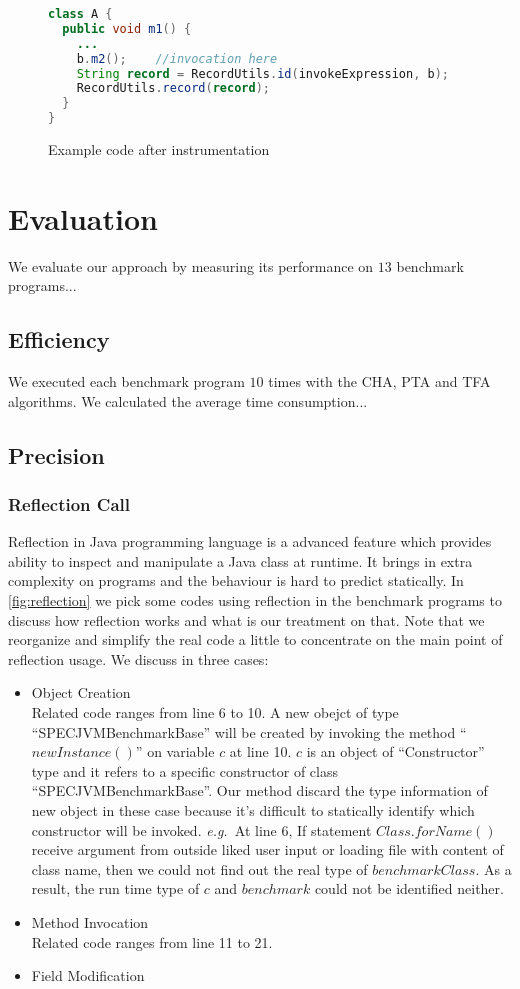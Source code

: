 \documentclass{fac}
\newcommand\eg{\textit{e.g.\ }}
\begin{document}
\begin{figure}
\begin{lstlisting}[language={java},frame={single}]
class A {
  public void m1() {
    ...
    b.m2();    //invocation here
    String record = RecordUtils.id(invokeExpression, b);
    RecordUtils.record(record);
  }
}
\end{lstlisting}
\caption{Example code after instrumentation}
\label{fig:after-instru}
\end{figure}



\section{Evaluation}\label{sec:evaluation}
We evaluate our approach by measuring its performance on $13$ benchmark programs...
\subsection{Efficiency}\label{subsec:efficiency}
We executed each benchmark program $10$ times with the CHA, PTA and TFA algorithms. We calculated the average time consumption...
\subsection{Precision}\label{subsec:precision}
\subsubsection{Reflection Call}\label{subsubsec:reflection-call}
Reflection in Java programming language is a advanced feature which provides ability to inspect and manipulate a Java class at runtime. It brings in extra complexity on programs and the behaviour is hard to predict statically. In \ref{fig:reflection} we pick some codes using reflection in the benchmark programs to discuss how reflection works and what is our treatment on that. Note that we reorganize and simplify the real code a little to concentrate on the main point of reflection usage. We discuss in three cases:
\begin{itemize}
\item Object Creation \\
Related code ranges from line 6 to 10. A new obejct of type ``SPECJVMBenchmarkBase'' will be created by invoking the method ``$newInstance()$'' on variable $c$ at line 10. $c$ is an object of ``Constructor'' type and it refers to a specific constructor of class ``SPECJVMBenchmarkBase''. Our method discard the type information of new object in these case because it's difficult to statically identify which constructor will be invoked. \eg At line 6, If statement $Class.forName()$ receive argument from outside liked user input or loading file with content of class name, then we could not find out the real type of $benchmarkClass$. As a result, the run time type of $c$ and $benchmark$ could not be identified neither.
\item Method Invocation\\
Related code ranges from line 11 to 21.
\item Field Modification\\
\end{itemize}
\end{document}
